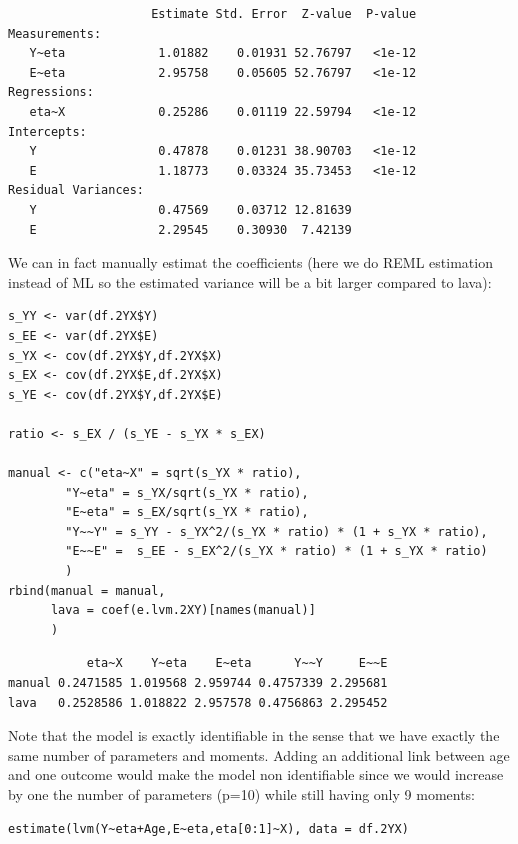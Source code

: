 \documentclass[12pt]{article}
\begin{document}
\begin{verbatim}
                    Estimate Std. Error  Z-value  P-value
Measurements:                                            
   Y~eta             1.01882    0.01931 52.76797   <1e-12
   E~eta             2.95758    0.05605 52.76797   <1e-12
Regressions:                                             
   eta~X             0.25286    0.01119 22.59794   <1e-12
Intercepts:                                              
   Y                 0.47878    0.01231 38.90703   <1e-12
   E                 1.18773    0.03324 35.73453   <1e-12
Residual Variances:                                      
   Y                 0.47569    0.03712 12.81639         
   E                 2.29545    0.30930  7.42139
\end{verbatim}

We can in fact manually estimat the coefficients (here we do REML
estimation instead of ML so the estimated variance will be a bit
larger compared to lava):

\lstset{language=r,label= ,caption= ,captionpos=b,numbers=none}
\begin{lstlisting}
s_YY <- var(df.2YX$Y)
s_EE <- var(df.2YX$E)
s_YX <- cov(df.2YX$Y,df.2YX$X)
s_EX <- cov(df.2YX$E,df.2YX$X)
s_YE <- cov(df.2YX$Y,df.2YX$E)

ratio <- s_EX / (s_YE - s_YX * s_EX)

manual <- c("eta~X" = sqrt(s_YX * ratio),
	    "Y~eta" = s_YX/sqrt(s_YX * ratio),
	    "E~eta" = s_EX/sqrt(s_YX * ratio),
	    "Y~~Y" = s_YY - s_YX^2/(s_YX * ratio) * (1 + s_YX * ratio),
	    "E~~E" =  s_EE - s_EX^2/(s_YX * ratio) * (1 + s_YX * ratio)
	    )
rbind(manual = manual,
      lava = coef(e.lvm.2XY)[names(manual)]
      )
\end{lstlisting}

\begin{verbatim}
           eta~X    Y~eta    E~eta      Y~~Y     E~~E
manual 0.2471585 1.019568 2.959744 0.4757339 2.295681
lava   0.2528586 1.018822 2.957578 0.4756863 2.295452
\end{verbatim}

Note that the model is exactly identifiable in the sense that we have
exactly the same number of parameters and moments. Adding an
additional link between age and one outcome would make the model non
identifiable since we would increase by one the number of parameters
(p=10) while still having only 9 moments:
\lstset{language=r,label= ,caption= ,captionpos=b,numbers=none}
\begin{lstlisting}
estimate(lvm(Y~eta+Age,E~eta,eta[0:1]~X), data = df.2YX)
\end{lstlisting}
\end{document}
